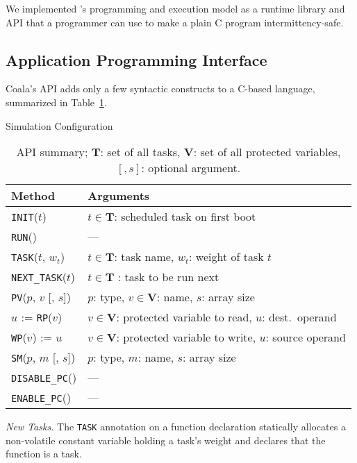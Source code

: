 We implemented \sys's programming and execution model as a runtime library and API that a programmer can use to make a plain C program intermittency-safe.
%
\subsection{Application Programming Interface}
\label{sec:coala_api}
%
Coala's API adds only a few syntactic constructs to a C-based language, summarized
in Table~\ref{table:coala_api}.
%
\begin{table}%
\caption{Simulation Configuration}
\label{tab:one}
\begin{minipage}{\columnwidth}
\begin{center}
\begin{tabular}{ll}
  \toprule
	{Method} & {Arguments} \\
	\hline
	\texttt{INIT}($t$) & $t \in \mathbf{T}$: scheduled task on first boot \\
	\texttt{RUN}() & --- \\
	\texttt{TASK}($t$, $w_t$) & $t \in \mathbf{T}$: task name, $w_t$: weight of task $t$ \\
	\texttt{NEXT\_TASK}($t$) & $t \in \mathbf{T}$ : task to be run next \\
	\texttt{PV}($p$, $v$ [, $s$]) & $p$: type, $v \in \mathbf{V}$: name, $s$: array size \\
	$u$ := \texttt{RP}($v$) & $v \in \mathbf{V}$: protected variable to read, $u$: dest.\ operand \\
	\texttt{WP}($v$) := $u$ &  $v \in \mathbf{V}$: protected variable to write, $u$: source operand \\
	\texttt{SM}($p$, $m$ [, $s$]) & $p$: type, $m$: name, $s$: array size \\
	\texttt{DISABLE\_PC}() & --- \\
	\texttt{ENABLE\_PC}() & --- \\
  \bottomrule
\end{tabular}
\caption{API summary; $\mathbf{T}$: set of all tasks, $\mathbf{V}$: set of all protected variables, $[, s]$: optional argument.}
\label{table:coala_api}
\end{center}
\end{minipage}
\end{table}%

\noindent\textit{New Tasks.} The \texttt{TASK} annotation on a function
declaration statically allocates a non-volatile constant variable holding a
task's weight and declares that the function is a task.

